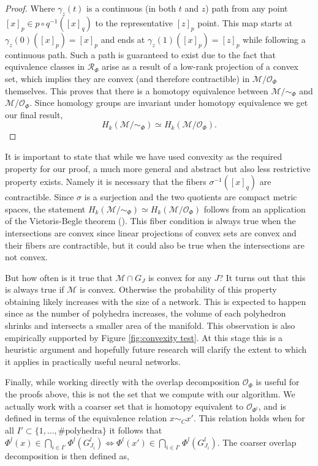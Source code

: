 \documentclass[10pt]{article} %
\theoremstyle{plain}
\theoremstyle{definition}
\theoremstyle{remark}
\begin{document}
\begin{proof}
    Where $\gamma_z(t)$ is a continuous (in both $t$ and $z$) path from any point $[x]_p \in p\circ q^{-1}([x]_q)$ to the representative $[z]_p$ point. This map starts at $\gamma_z(0)([x]_p) = [x]_p$ and ends at $\gamma_z(1)([x]_p) = [z]_p$ while following a continuous path. Such a path is guaranteed to exist due to the fact that equivalence classes in $\mathcal{R}_\Phi$ arise as a result of a low-rank projection of a convex set, which implies they are convex (and therefore contractible) in $\mathcal{M}/\mathcal{O}_\Phi$ themselves. This proves that there is a homotopy equivalence between $\mathcal{M}/\sim_\Phi$ and $\mathcal{M}/\mathcal{O}_\Phi$. Since homology groups are invariant under homotopy equivalence we get our final result,
    \begin{equation*}
        H_k(\mathcal{M}/\sim_\Phi) \simeq H_k(\mathcal{M}/\mathcal{O}_\Phi).
    \end{equation*}
\end{proof}

It is important to state that while we have used convexity as the required property for our proof, a much more general and abstract but also less restrictive property exists. Namely it is necessary that the fibers $\sigma^{-1}([x]_q)$ are contractible. Since $\sigma$ is a surjection and the two quotients are compact metric spaces, the statement $H_k(\mathcal{M}/\sim_\Phi) \simeq H_k(\mathcal{M}/\mathcal{O}_\Phi)$ follows from an application of the Vietoris-Begle theorem (\cite{spanier1966algebraic}). This fiber condition is always true when the intersections are convex since linear projections of convex sets are convex and their fibers are contractible, but it could also be true when the intersections are not convex. 

But how often is it true that $\mathcal{M} \cap G_J$ is convex for any $J$? It turns out that this is always true if $\mathcal{M}$ is convex. Otherwise the probability of this property obtaining likely increases with the size of a network. This is expected to happen since as the number of polyhedra increases, the volume of each polyhedron shrinks and intersects a smaller area of the manifold. This observation is also empirically supported by Figure \ref{fig:convexity test}. At this stage this is a heuristic argument and hopefully future research will clarify the extent to which it applies in practically useful neural networks. 



Finally, while working directly with the overlap decomposition $\mathcal{O}_\Phi$ is useful for the proofs above, this is not the set that we compute with our algorithm. We actually work with a coarser set that is homotopy equivalent to $\mathcal{O}_{\Phi^l}$, {and is defined in terms of the equivalence relation $x \sim_C x'$. This relation holds when for all $I' \subset \{1,..., \# \text{polyhedra}\}$ it follows that $\Phi^l(x) \in \bigcap\limits_{i \in I'}\Phi^l(G^l_{J_i}) \iff \Phi^l(x') \in \bigcap\limits_{i \in I'}\Phi^l(G^l_{J_i})$. The coarser overlap decomposition is then defined} as,
\end{document}
